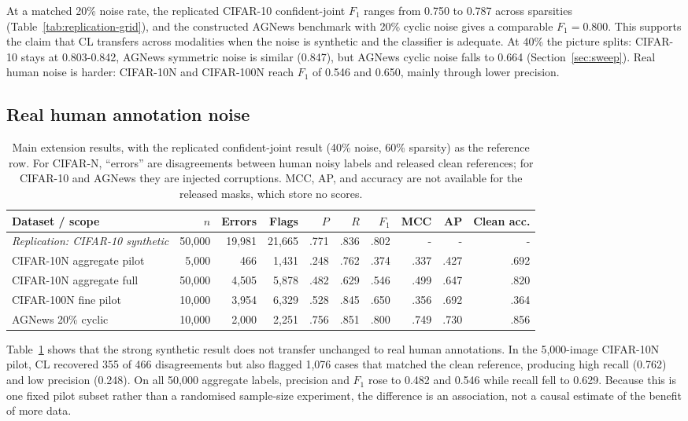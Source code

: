 \documentclass[11pt]{article}
\begin{document}
At a matched 20\% noise rate, the replicated CIFAR-10 confident-joint $F_1$
ranges from 0.750 to 0.787 across sparsities (Table~\ref{tab:replication-grid}),
and the constructed AGNews benchmark with 20\% cyclic noise gives a comparable
$F_1=0.800$. This supports the claim that CL transfers across modalities when
the noise is synthetic and the classifier is adequate. At 40\% the picture
splits: CIFAR-10 stays at 0.803-0.842, AGNews symmetric noise is similar
(0.847), but AGNews cyclic noise falls to 0.664 (Section~\ref{sec:sweep}).
Real human noise is harder: CIFAR-10N and CIFAR-100N reach $F_1$
of 0.546 and 0.650, mainly through lower precision.

\subsection{Real human annotation noise}

\begin{table}[t]
\centering
\small
\setlength{\tabcolsep}{4pt}
\begin{tabular}{lrrrrrrrrr}
\toprule
\textbf{Dataset / scope} & \textbf{$n$} & \textbf{Errors} & \textbf{Flags} & \textbf{$P$} & \textbf{$R$} & \textbf{$F_1$} & \textbf{MCC} & \textbf{AP} & \textbf{Clean acc.} \\
\midrule
\emph{Replication: CIFAR-10 synthetic} & 50,000 & 19,981 & 21,665 & .771 & .836 & .802 & - & - & - \\
\midrule
CIFAR-10N aggregate pilot & 5,000 & 466 & 1,431 & .248 & .762 & .374 & .337 & .427 & .692 \\
CIFAR-10N aggregate full & 50,000 & 4,505 & 5,878 & .482 & .629 & .546 & .499 & .647 & .820 \\
CIFAR-100N fine pilot & 10,000 & 3,954 & 6,329 & .528 & .845 & .650 & .356 & .692 & .364 \\
AGNews 20\% cyclic & 10,000 & 2,000 & 2,251 & .756 & .851 & .800 & .749 & .730 & .856 \\
\bottomrule
\end{tabular}
\caption{Main extension results, with the replicated confident-joint result
(40\% noise, 60\% sparsity) as the reference row. For CIFAR-N, ``errors'' are
disagreements between human noisy labels and released clean references; for
CIFAR-10 and AGNews they are injected corruptions. MCC, AP, and accuracy are
not available for the released masks, which store no scores.}
\label{tab:main-results}
\end{table}

Table~\ref{tab:main-results} shows that the strong synthetic result does not
transfer unchanged to real human annotations. In the 5,000-image CIFAR-10N
pilot, CL recovered 355 of 466 disagreements but also flagged 1,076 cases that
matched the clean reference, producing high recall (0.762) and low precision
(0.248). On all 50,000 aggregate labels, precision and $F_1$ rose to 0.482 and
0.546 while recall fell to 0.629. Because this is one fixed pilot subset rather
than a randomised sample-size experiment, the difference is an association,
not a causal estimate of the benefit of more data.
\end{document}
